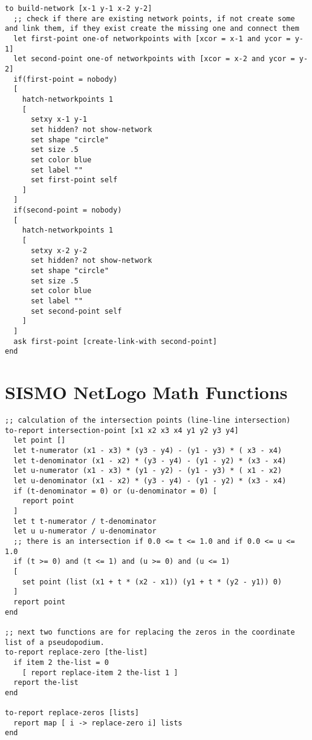 \begin{lstlisting}
to build-network [x-1 y-1 x-2 y-2]
  ;; check if there are existing network points, if not create some and link them, if they exist create the missing one and connect them
  let first-point one-of networkpoints with [xcor = x-1 and ycor = y-1]
  let second-point one-of networkpoints with [xcor = x-2 and ycor = y-2]
  if(first-point = nobody)
  [
    hatch-networkpoints 1
    [
      setxy x-1 y-1
      set hidden? not show-network
      set shape "circle"
      set size .5
      set color blue
      set label ""
      set first-point self
    ]
  ]
  if(second-point = nobody)
  [
    hatch-networkpoints 1
    [
      setxy x-2 y-2
      set hidden? not show-network
      set shape "circle"
      set size .5
      set color blue
      set label ""
      set second-point self
    ]
  ]
  ask first-point [create-link-with second-point]
end
\end{lstlisting}

\section{SISMO NetLogo Math Functions}
\begin{lstlisting}
;; calculation of the intersection points (line-line intersection)
to-report intersection-point [x1 x2 x3 x4 y1 y2 y3 y4]
  let point []
  let t-numerator (x1 - x3) * (y3 - y4) - (y1 - y3) * ( x3 - x4)
  let t-denominator (x1 - x2) * (y3 - y4) - (y1 - y2) * (x3 - x4)
  let u-numerator (x1 - x3) * (y1 - y2) - (y1 - y3) * ( x1 - x2)
  let u-denominator (x1 - x2) * (y3 - y4) - (y1 - y2) * (x3 - x4)
  if (t-denominator = 0) or (u-denominator = 0) [
    report point
  ]
  let t t-numerator / t-denominator
  let u u-numerator / u-denominator
  ;; there is an intersection if 0.0 <= t <= 1.0 and if 0.0 <= u <= 1.0
  if (t >= 0) and (t <= 1) and (u >= 0) and (u <= 1)
  [
    set point (list (x1 + t * (x2 - x1)) (y1 + t * (y2 - y1)) 0)
  ]
  report point
end

;; next two functions are for replacing the zeros in the coordinate list of a pseudopodium.
to-report replace-zero [the-list]
  if item 2 the-list = 0
    [ report replace-item 2 the-list 1 ]
  report the-list
end

to-report replace-zeros [lists]
  report map [ i -> replace-zero i] lists
end
\end{lstlisting}

